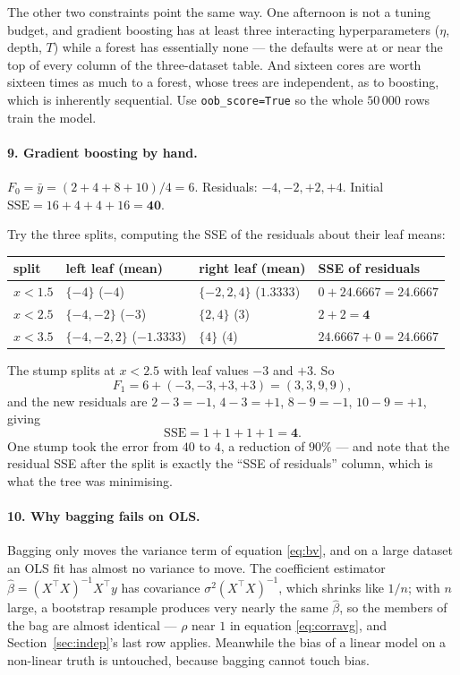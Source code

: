 \documentclass[11pt]{article}
\begin{document}
The other two constraints point the same way. One afternoon is not a tuning
budget, and gradient boosting has at least three interacting hyperparameters
($\eta$, depth, $T$) while a forest has essentially none --- the defaults were
at or near the top of every column of the three-dataset table. And sixteen
cores are worth sixteen times as much to a forest, whose trees are
independent, as to boosting, which is inherently sequential. Use
\texttt{oob\_score=True} so the whole $50\,000$ rows train the model.

\paragraph{9. Gradient boosting by hand.}
$F_0 = \bar y = (2 + 4 + 8 + 10)/4 = 6$. Residuals: $-4, -2, +2, +4$. Initial
$\mathrm{SSE} = 16 + 4 + 4 + 16 = \mathbf{40}$.

Try the three splits, computing the SSE of the residuals about their leaf
means:
\begin{center}
\begin{tabular}{llll}
  \toprule
  split & left leaf (mean) & right leaf (mean) & SSE of residuals \\
  \midrule
  $x < 1.5$ & $\{-4\}$ ($-4$) & $\{-2, 2, 4\}$ ($1.3333$)
    & $0 + 24.6667 = 24.6667$ \\
  $x < 2.5$ & $\{-4, -2\}$ ($-3$) & $\{2, 4\}$ ($3$)
    & $2 + 2 = \mathbf{4}$ \\
  $x < 3.5$ & $\{-4, -2, 2\}$ ($-1.3333$) & $\{4\}$ ($4$)
    & $24.6667 + 0 = 24.6667$ \\
  \bottomrule
\end{tabular}
\end{center}
The stump splits at $x < 2.5$ with leaf values $-3$ and $+3$. So
\[
  F_1 = 6 + (-3, -3, +3, +3) = (3, 3, 9, 9),
\]
and the new residuals are $2 - 3 = -1$, $4 - 3 = +1$, $8 - 9 = -1$,
$10 - 9 = +1$, giving
\[
  \mathrm{SSE} = 1 + 1 + 1 + 1 = \mathbf{4}.
\]
One stump took the error from $40$ to $4$, a reduction of $90\%$ --- and note
that the residual SSE after the split is exactly the ``SSE of residuals''
column, which is what the tree was minimising.

\paragraph{10. Why bagging fails on OLS.}
Bagging only moves the variance term of equation \eqref{eq:bv}, and on a large
dataset an OLS fit has almost no variance to move. The coefficient estimator
$\hat\beta = (X^\top X)^{-1}X^\top y$ has covariance
$\sigma^2 (X^\top X)^{-1}$, which shrinks like $1/n$; with $n$ large, a
bootstrap resample produces very nearly the same $\hat\beta$, so the members of
the bag are almost identical --- $\rho$ near $1$ in equation
\eqref{eq:corravg}, and Section~\ref{sec:indep}'s last row applies. Meanwhile
the bias of a linear model on a non-linear truth is untouched, because bagging
cannot touch bias.
\end{document}
